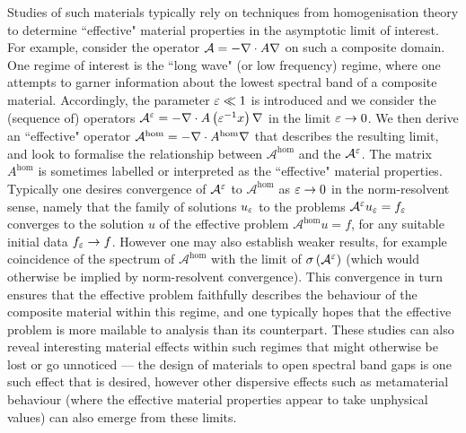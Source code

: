 Studies of such materials typically rely on techniques from homogenisation theory to determine ``effective" material properties in the asymptotic limit of interest.
For example, consider the operator $\mathcal{A}=-\nabla\cdot A\nabla$ on such a composite domain.
One regime of interest is the ``long wave" (or low frequency) regime, where one attempts to garner information about the lowest spectral band of a composite material.
Accordingly, the parameter $\varepsilon\ll 1$ is introduced and we consider the (sequence of) operators $\mathcal{A}^{\varepsilon} = -\nabla\cdot A\left( \varepsilon^{-1}x \right)\nabla$ in the limit $\varepsilon\rightarrow0$.
We then derive an ``effective" operator $\mathcal{A}^{\mathrm{hom}} = -\nabla\cdot A^{\mathrm{hom}}\nabla$ that describes the resulting limit, and look to formalise the relationship between $\mathcal{A}^{\mathrm{hom}}$ and the $\mathcal{A}^{\varepsilon}$.
The matrix $A^{\mathrm{hom}}$ is sometimes labelled or interpreted as the ``effective" material properties.
Typically one desires convergence of $\mathcal{A}^{\varepsilon}$ to $\mathcal{A}^{\mathrm{hom}}$ as $\varepsilon\rightarrow0$ in the norm-resolvent sense, namely that the family of solutions $u_{\varepsilon}$ to the problems $\mathcal{A}^{\varepsilon}u_{\varepsilon}=f_{\varepsilon}$ converges to the solution $u$ of the effective problem $\mathcal{A}^{\mathrm{hom}}u = f$, for any suitable initial data $f_{\varepsilon}\rightarrow f$.
However one may also establish weaker results, for example coincidence of the spectrum of $\mathcal{A}^{\mathrm{hom}}$ with the limit of $\sigma\left( \mathcal{A}^{\varepsilon} \right)$  (which would otherwise be implied by norm-resolvent convergence).
This convergence in turn ensures that the effective problem faithfully describes the behaviour of the composite material within this regime, and one typically hopes that the effective problem is more mailable to analysis than its counterpart.
These studies can also reveal interesting material effects within such regimes that might otherwise be lost or go unnoticed --- the design of materials to open spectral band gaps is one such effect that is desired, however other dispersive effects such as metamaterial behaviour (where the effective material properties appear to take unphysical values) can also emerge from these limits.




